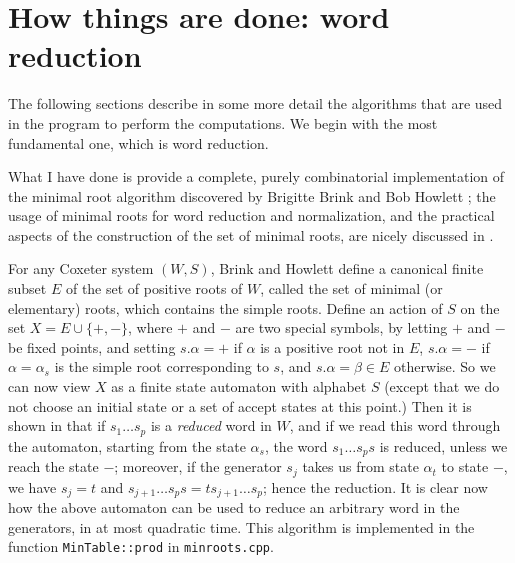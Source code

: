 \documentclass[11pt]{article}
\renewcommand{\a}{\alpha}
\renewcommand{\b}{\beta}
\begin{document}
\section{How things are done: word reduction}\label{section:reduction}

The following sections describe in some more detail the algorithms that are
used in the program to perform the computations. We begin with the most
fundamental one, which is word reduction.

What I have done is provide a complete, purely combinatorial implementation
of the minimal root algorithm discovered by Brigitte Brink and Bob Howlett
\cite{brink_howlett:1993}; the usage of minimal roots for word reduction
and normalization, and the practical aspects of the construction of the
set of minimal roots, are nicely discussed in \cite{casselman:2002}.

For any Coxeter system $(W,S)$, Brink and Howlett define a
canonical finite subset $E$ of the set of positive roots of $W$, called the 
set of minimal (or elementary) roots, which contains the simple roots.
Define an action of $S$ on the set $X=E\cup\{+,-\}$, where $+$ and $-$ are
two special symbols, by letting $+$ and $-$ be fixed points, and setting
$s.\a=+$ if $\a$ is a positive root not in $E$, $s.\a=-$ if $\a=\a_s$ is
the simple root corresponding to $s$, and $s.\a=\b\in E$ otherwise. So
we can now view $X$ as a finite state automaton with alphabet $S$ (except
that we do not choose an initial state or a set of accept states at this
point.) Then it is shown in \cite{brink_howlett:1993} that if $s_1\ldots s_p$ 
is a {\em reduced} word in $W$, and if we read this word through the automaton,
starting from the state $\a_s$, the word $s_1\ldots s_ps$ is reduced, unless
we reach the state $-$; moreover, if the generator $s_j$ takes us from state
$\a_t$ to state $-$, we have $s_j=t$ and 
$s_{j+1}\ldots s_ps=ts_{j+1}\ldots s_p$; hence the reduction. It is clear
now how the above automaton can be used to reduce an arbitrary word in
the generators, in at most quadratic time. This algorithm is implemented
in the function {\tt MinTable::prod} in {\tt minroots.cpp}.
\end{document}
